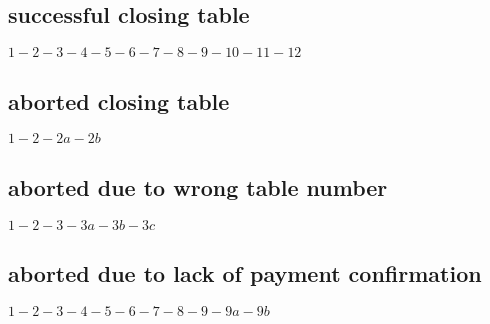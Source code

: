 \documentclass[a4paper,11pt,oneside]{book}
\begin{document}
\subsection{successful closing table}
$1-2-3-4-5-6-7-8-9-10-11-12$

\subsection{aborted closing table}

$1-2-2a-2b$

\subsection{aborted due to wrong table number}

$1-2-3-3a-3b-3c$

\subsection{aborted due to lack of payment confirmation}

$1-2-3-4-5-6-7-8-9-9a-9b$
\end{document}
